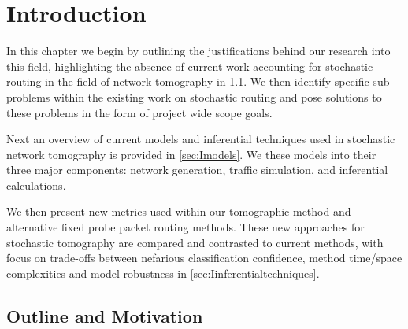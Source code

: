 \chapter{Introduction}
\label{cha:intro}
In this chapter we begin by outlining the justifications behind our research into this field, highlighting the absence of current work accounting for stochastic routing in the field of network tomography in \cref{sec:Imotivationandoutline}. We then identify specific sub-problems within the existing work on stochastic routing and pose solutions to these problems
in the form of project wide scope goals.\par
Next an overview of current models and inferential techniques used in stochastic network tomography is provided in \cref{sec:Imodels}. We these models into their three major components: network generation, traffic simulation, and inferential calculations.\par
We then present new metrics used within our tomographic method and alternative fixed probe packet routing methods. These new approaches for stochastic tomography are compared and contrasted to current methods, with focus on trade-offs between nefarious classification confidence, method time/space complexities and model robustness in \cref{sec:Iinferentialtechniques}.\par

\section{Outline and Motivation}
\label{sec:Imotivationandoutline}

